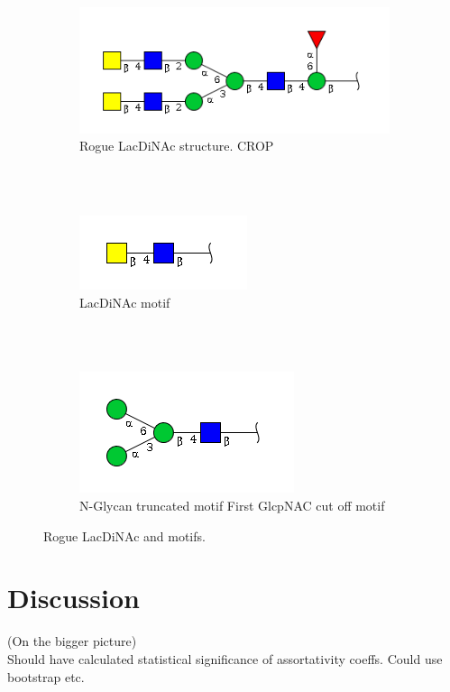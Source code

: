 \documentclass[12pt,a4paper]{article}
\begin{document}
\begin{figure}[ht!]
    \centering
    \begin{subfigure}[t]{1.0\textwidth}
        \centering
        \includegraphics[scale=0.6]{trees/rogue_LacDiNAc_structure.png}
        \caption{Rogue LacDiNAc structure. CROP}
    \end{subfigure}%
    \\
    \bigbreak
    ~ 
	\\
    \begin{subfigure}[t]{1.0\textwidth}
        \centering
        \includegraphics[scale=0.6]{trees/LacDiNAc_motif.png}
        \caption{LacDiNAc motif}
    \end{subfigure}
    \\
    \bigbreak
    ~ 
	\\
    \begin{subfigure}[t]{1.0\textwidth}
        \centering
        \includegraphics[scale=0.6]{trees/N-Glycan_truncated_motif__First_GlcpNAC_cut_off_motif.png}
        \caption{N-Glycan truncated motif First GlcpNAC cut off motif}
    \end{subfigure}
    \caption{Rogue LacDiNAc and motifs.}
\label{fig:rogue_lacdinac}
\end{figure}


\newpage
\section{Discussion}
\label{sec:discussion}
(On the bigger picture)\\
Should have calculated statistical significance of assortativity coeffs. Could use bootstrap etc.\\
\end{document}
